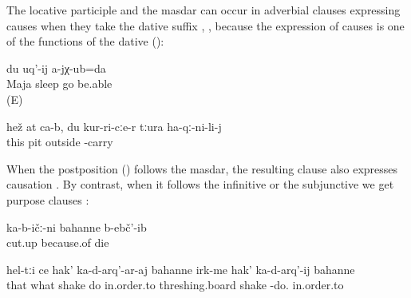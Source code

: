 The locative participle and the masdar can occur in adverbial clauses expressing causes when they take the dative suffix , , because the expression of causes is one of the functions of the dative ():
%
\begin{exe}
	\ex	\label{ex:ecause Maja was sleeping I (masc.) could not come.}
		du	uq'-ij	a-jχ-ub=da\\
		Maja	sleep		go	be.able\\
	\glt	{} (E)

	\ex	\label{ex:This is for you, because you helped me out of the pit}
	\gll	hež	at	ca-b,	du	kur-ri-cːe-r	tːura	ha-qː-ni-li-j\\
		this				pit	outside	-carry\\
	\glt	{}
\end{exe}

When the postposition   () follows the masdar, the resulting clause also expresses causation . By contrast, when it follows the infinitive or the subjunctive we get purpose clauses :
%
\begin{exe}
	\ex	\label{ex:‎Because they cut it, they died}
	\gll	ka-b-ičː-ni	bahanne	b-ebč'-ib\\
		cut.up	because.of	die\\
	\glt	{}


	\ex	\label{ex:‎in order to shake those, in order to shake the threshing boards}
	\gll	hel-tːi	ce	hak'	ka-d-arq'-ar-aj	bahanne	irk-me	hak'	ka-d-arq'-ij	bahanne\\
		that	what	shake	do	in.order.to	threshing.board	shake	-do.	in.order.to\\
	\glt	{}
\end{exe}


